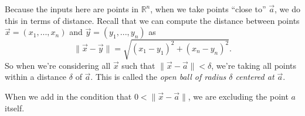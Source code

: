 \documentclass{ximera}
\begin{document}
Because the inputs here are points in $\mathbb{R}^n$, when we take points ``close to'' $\vec{a}$, we do this in terms of distance. Recall that we can compute the distance between points $\vec{x}=(x_1,...,x_n)$ and $\vec{y}=(y_1,...,y_n)$ as
\[
\|\vec{x}-\vec{y}\| = \sqrt{(x_1-y_1)^2+(x_n-y_n)^2}.
\]
So when we're considering all $\vec{x}$ such that $\|\vec{x}-\vec{a}\| < \delta$, we're taking all points within a distance $\delta$ of $\vec{a}$. This is called the \emph{open ball of radius $\delta$ centered at $\vec{a}$}. 

\begin{image}
\end{image}

When we add in the condition that $0<\|\vec{x}-\vec{a}\|$, we are excluding the point $a$ itself.
\end{document}
